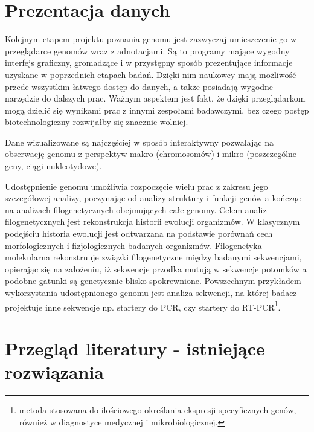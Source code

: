 \section{Prezentacja danych}
Kolejnym etapem projektu poznania genomu jest zazwyczaj umieszczenie go w przeglądarce genomów wraz z adnotacjami. Są to programy mające wygodny interfejs graficzny, gromadzące i w przystępny sposób prezentujące informacje uzyskane w poprzednich etapach badań. Dzięki nim naukowcy mają możliwość przede wszystkim łatwego dostęp do danych, a także posiadają wygodne narzędzie do dalszych prac. 
Ważnym aspektem jest fakt, że dzięki przeglądarkom mogą dzielić się wynikami prac z innymi zespołami badawczymi, bez czego postęp biotechnologiczny rozwijałby się znacznie wolniej.

Dane wizualizowane są najczęściej w sposób interaktywny pozwalając na obserwację genomu z perspektyw makro (chromosomów) i mikro (poszczególne geny, ciągi nukleotydowe).

Udostępnienie genomu umożliwia rozpoczęcie wielu prac z zakresu jego szczegółowej analizy, poczynając od analizy struktury i funkcji genów a kończąc na analizach filogenetycznych obejmujących całe genomy. 
Celem analiz filogenetycznych jest rekonstrukcja historii ewolucji  organizmów. W klasycznym podejściu historia ewolucji jest odtwarzana na podstawie porównań cech morfologicznych i fizjologicznych badanych organizmów.
Filogenetyka molekularna rekonstruuje związki filogenetyczne między badanymi sekwencjami, opierając się na założeniu, iż sekwencje przodka mutują w sekwencje potomków a podobne gatunki są genetycznie blisko spokrewnione.
Powszechnym przykładem wykorzystania udostępnionego genomu jest analiza sekwencji, na której badacz projektuje inne sekwencje np. startery do PCR, czy startery do RT-PCR\footnote{metoda stosowana do ilościowego określania ekspresji specyficznych genów, również w diagnostyce medycznej i mikrobiologicznej.}.


\section{Przegląd literatury - istniejące rozwiązania}

